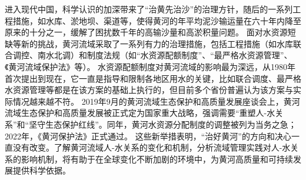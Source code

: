 进入现代中国，科学认识的加深带来了“治黄先治沙”的治理方针，随后的一系列工程措施，如水库、淤地坝、渠道等，使得黄河的年平均泥沙输运量在六十年内降至原来的十分之一，缓解了困扰数千年的高输沙量和高淤积量问题\cite{wang2016a}。
面对水资源短缺等新的挑战，黄河流域采取了一系列有力的治理措施，包括工程措施（如水库联合调控、南水北调）和制度法规（如“水资源配额制度”、“最严格水资源管理”、《黄河流域保护法》等）\cite{shuilibuhuangheshuiliweiyuanhui2010}。
水资源配额制度对黄河流域的影响最为深远，从1980年首次提出到现在，它一直是指导和限制各地区用水的关键，比如联合调度、最严格水资源管理等都是在该方案的基础上执行的，但目前多个省份普遍认为该方案与实际情况越来越不符\cite{wang2019b,wang2019e}。
2019年9月的黄河流域生态保护和高质量发展座谈会上，黄河流域生态保护和高质量发展被正式定为国家重大战略，强调需要“重塑人-水关系”和“坚守生态保护红线”。同年，黄河水资源分配制度的调整被列为当务之急；2022年，《黄河保护法》正式通过\cite{lu2019,dongzhanfeng2020}。
这些新举措表明，“治好黄河”的方向和决心一直没有改变。了解黄河流域人-水关系的变化和机制，分析流域管理实践对人-水关系的影响机制，将有助于在全球变化不断加剧的环境中，为黄河高质量和可持续发展提供科学依据。
